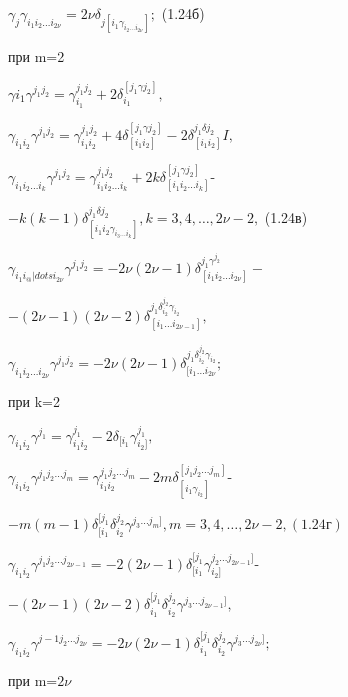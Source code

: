 \documentclass{article}
\begin{document}
{$\gamma_{j}\gamma_{i_1 i_2 \dots i_{2\nu}}=2\nu\delta_{j[i_1\gamma_{i_2 \dots i_{2\nu}}]};$ (1.24б)\par
при m=2\par
$\gamma{i_1}\gamma^{j_1 j_2}=\gamma_{i_1}^{j_1 j_2}+2\delta_{i_1}^{[j_1\gamma j_2]},$\par
$\gamma_{i_1 i_2}\gamma^{j_1 j_2}=\gamma_{i_1 i_2}^{j_1 j_2}+4\delta_{[i_1 i_2]}^{[j_1\gamma j_2]}-2\delta_{[i_1 i_2]}^{j_1 \delta j_2}I,$\par
$\gamma_{i_1 i_2 \dots i_k}\gamma^{j_1 j_2}=\gamma_{i_1 i_2 \dots i_k}^{j_1 j_2}+2k\delta_{[i_1 i_2 \dots i_k]}^{[j_1 \gamma j_2]}$-\par
$-k(k-1)\delta^{j_1 \delta j_2}_{[i_1 i_2 \gamma_{i_3 \dots i_k}]}, k=3,4,\dots,2\nu-2,$ (1.24в)\par
$\gamma_{i_1 i_@ |dots i_{2\nu}}\gamma^{j_1 j_2}=-2\nu(2\nu-1)\delta_{[i_1 i_2 \dots i_{2\nu}]}^{j_1 \gamma^{j_2}}-$\par
\begin{center}
$-(2\nu-1)(2\nu-2)\delta_{[i_1\dots i_{2\nu-1}]}^{j_1 \delta_{i_2}^{j_2} \gamma_{i_2}},$\par
\end{center}
$\gamma_{i_1 i_2 \dots i_{2\nu}}\gamma^{j_1 j_2}=-2\nu(2\nu-1)\delta_{[i_1 \dots i_{2\nu}}^{j_1 \delta_{i_2}^{j_2}\gamma_{i_2}};$\par
при k=2\par
$\gamma_{i_1 i_2}\gamma^{j_1}=\gamma_{i_1 i_2}^{j_1}-2\delta_{[i_1}\gamma_{i_2]}^{j_1},$\par
$\gamma_{i_1 i_2}\gamma^{j_1 j_2 \dots j_m}=\gamma_{i_1 i_2}^{j_1 j_2 \dots j_m}-2m\delta^{[j_1 j_2 \dots j_m]}_{[i_1 \gamma_{i_2}]}$-\par
$-m(m-1)\delta_{[i_1}^{[j_1}\delta_{i_2}^{j_2}\gamma^{j_3 \dots j_m]}, m=3,4,\dots,2\nu-2, (1.24г)$\par
$\gamma_{i_1 i_2}\gamma^{j_1 j_2 \dots j_{2\nu-1}}=-2(2\nu-1)\delta_{[i_1}^{[j_1}\gamma_{i_2]}^{j_2 \dots j_{2\nu-1}]}$-\par
\begin{center}
$-(2\nu-1)(2\nu-2)\delta_{i_1}^{[j_1}\delta_{i_2}^{j_2}\gamma^{j_3 \dots j_{2\nu-1}]},$\par
\end{center}
$\gamma_{i_1 i_2}\gamma^{j-1 j_2 \dots j_{2\nu}}=-2\nu(2\nu-1)\delta_{i_1}^{[j_1}\delta_{i_2}^{j_2}\gamma^{j_3 \dots j_{2\nu}]};$\par
\hspace{0.2cm}
при m=$2\nu$ \par
}
\end{document}
